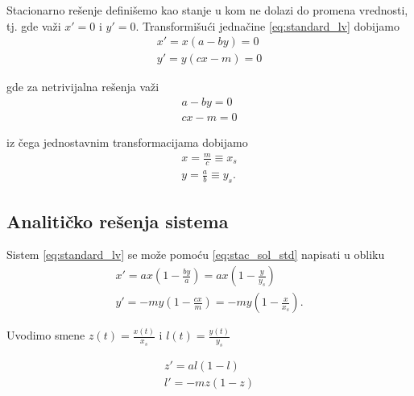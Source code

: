 \documentclass[a4paper]{article}
\begin{document}
Stacionarno rešenje definišemo kao stanje u kom ne dolazi do promena vrednosti, tj.
gde važi $x' = 0$ i $y' = 0$.
Transformišući jednačine \eqref{eq:standard_lv} dobijamo
    \begin{displaymath}
        \begin{aligned}
            x' = x (a - by) = 0\\
            y' = y (cx - m) = 0
        \end{aligned}
    \end{displaymath}

gde za netrivijalna rešenja važi
    \begin{displaymath}
        \begin{aligned}
            a - by = 0\\
            cx - m = 0
        \end{aligned}
    \end{displaymath}

iz čega jednostavnim transformacijama dobijamo
    \begin{equation}
        \label{eq:stac_sol_std}
        \begin{aligned}
            x = \frac{m}{c} \equiv x_s\\
            y = \frac{a}{b} \equiv y_s.
        \end{aligned}
    \end{equation}

\subsection{Analitičko rešenja sistema}

Sistem \eqref{eq:standard_lv} se može pomoću \eqref{eq:stac_sol_std}
napisati u obliku
\begin{displaymath}
    \begin{aligned}
        x' = ax(1 - \frac{by}{a}) = ax(1 - \frac{y}{y_s})\\
        y' = -my(1 - \frac{cx}{m}) = -my(1 - \frac{x}{x_s}).
    \end{aligned}
\end{displaymath}

Uvodimo smene $z(t) = \frac{x(t)}{x_s}$ i $l(t) = \frac{y(t)}{y_s}$

\begin{displaymath}
    \begin{aligned}
        z' = al(1 - l)\\
        l' = -mz(1 - z)
    \end{aligned}
\end{displaymath}
\end{document}
